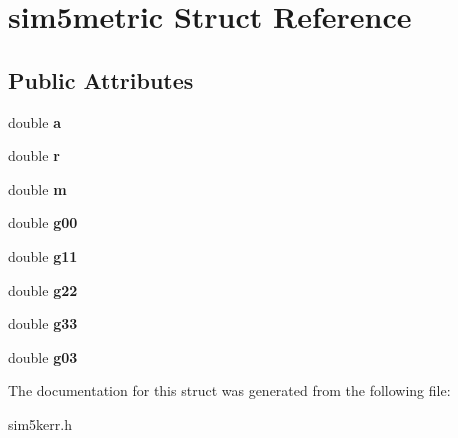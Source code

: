\hypertarget{structsim5metric}{}\section{sim5metric Struct Reference}
\label{structsim5metric}
\subsection*{Public Attributes}
\begin{DoxyCompactItemize}
\item 
\mbox{\label{structsim5metric_af93bd3dd2c0a3334202f0a736c587812}} 
double {\bfseries a}
\item 
\mbox{\label{structsim5metric_a2ab47f5d28f7b39ceca6bc42e9037086}} 
double {\bfseries r}
\item 
\mbox{\label{structsim5metric_aa1db93729640793c68cc08b2e76a1286}} 
double {\bfseries m}
\item 
\mbox{\label{structsim5metric_a27b12663cfdb9723c23db204e28827ce}} 
double {\bfseries g00}
\item 
\mbox{\label{structsim5metric_a3172ea3505f3038f9cd5d26548c025c8}} 
double {\bfseries g11}
\item 
\mbox{\label{structsim5metric_a283bf8dd12cc2fa78dcc3d82535edbe0}} 
double {\bfseries g22}
\item 
\mbox{\label{structsim5metric_aa4cc0cd125304292b24fbc957aa0ddb2}} 
double {\bfseries g33}
\item 
\mbox{\label{structsim5metric_aa1077a361f2df65b1c5c4b7d46779ef0}} 
double {\bfseries g03}
\end{DoxyCompactItemize}


The documentation for this struct was generated from the following file\+:\begin{DoxyCompactItemize}
\item 
sim5kerr.\+h\end{DoxyCompactItemize}
